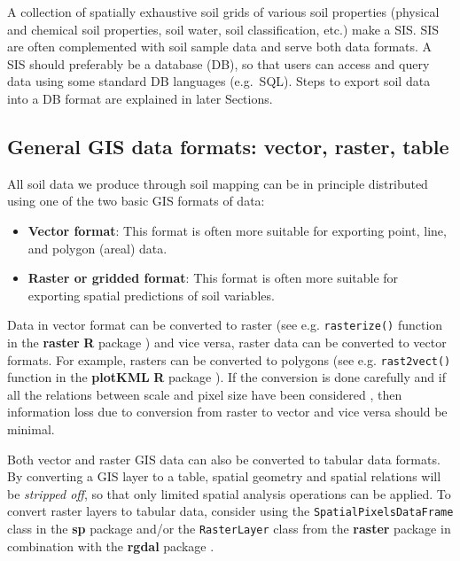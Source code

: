 \documentclass[10pt,b5paper,]{book}
\providecommand{\tightlist}{%
  \setlength{\itemsep}{0pt}\setlength{\parskip}{0pt}}
\theoremstyle{definition}
\theoremstyle{definition}
\theoremstyle{definition}
\theoremstyle{remark}
\begin{document}
A collection of spatially exhaustive soil grids of various soil
properties (physical and chemical soil properties, soil water, soil
classification, etc.) make a SIS. SIS are often complemented with soil
sample data and serve both data formats. A SIS should preferably be a
database (DB), so that users can access and query data using some
standard DB languages (e.g.~SQL). Steps to export soil data into a DB
format are explained in later Sections.

\hypertarget{general-gis-data-formats-vector-raster-table}{%
\subsection{General GIS data formats: vector, raster,
table}\label{general-gis-data-formats-vector-raster-table}}

All soil data we produce through soil mapping can be in principle
distributed using one of the two basic GIS formats of data:

\begin{itemize}
\tightlist
\item
  \textbf{Vector format}: This format is often more suitable for
  exporting point, line, and polygon (areal) data.
\item
  \textbf{Raster or gridded format}: This format is often more suitable
  for exporting spatial predictions of soil variables.
\end{itemize}

Data in vector format can be converted to raster (see e.g.
\texttt{rasterize()} function in the \textbf{raster} \textbf{R} package
) and vice versa, raster data can be converted to vector formats. For
example, rasters can be converted to polygons (see e.g.
\texttt{rast2vect()} function in the \textbf{plotKML} \textbf{R} package
). If the conversion is done carefully and if all the relations between
scale and pixel size have been considered \citep[see][ for more
details]{hengl2006finding}, then information loss due to conversion from
raster to vector and vice versa should be minimal.

Both vector and raster GIS data can also be converted to tabular data
formats. By converting a GIS layer to a table, spatial geometry and
spatial relations will be \emph{stripped off}, so that only limited
spatial analysis operations can be applied. To convert raster layers to
tabular data, consider using the \texttt{SpatialPixelsDataFrame} class
in the \textbf{sp} package and/or the \texttt{RasterLayer} class from
the \textbf{raster} package in combination with the \textbf{rgdal}
package \citep{bivand2013classes}.
\end{document}
